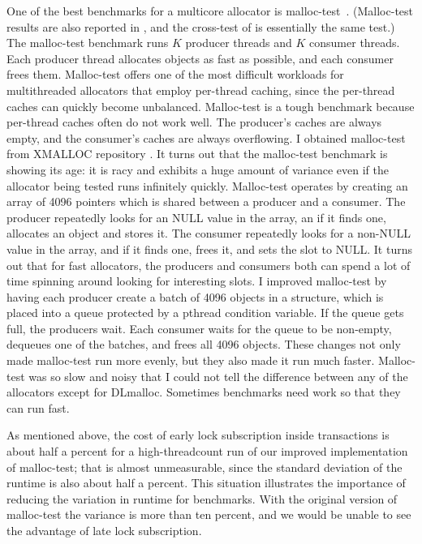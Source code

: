 \documentclass[natbib,sort&compress,10pt]{sigplanconf}
\begin{document}
One of the best benchmarks for a multicore allocator is
malloc-test~\cite{LeverBo00}.  (Malloc-test results are also reported
in \cite{Evans06}, and the cross-test of \cite{KukanovVo07} is
essentially the same test.)  The malloc-test benchmark runs $K$
producer threads and $K$ consumer threads.  Each producer thread
allocates objects as fast as possible, and each consumer frees them.
Malloc-test offers one of the most difficult workloads for
multithreaded allocators that employ per-thread caching, since the
per-thread caches can quickly become unbalanced.  Malloc-test is a
tough benchmark because per-thread caches often do not work well.  The
producer's caches are always empty, and the consumer's caches are
always overflowing.  I obtained malloc-test from XMALLOC repository
\cite{EderSc12}.  It turns out that the malloc-test benchmark is
showing its age: it is racy and exhibits a huge amount of variance
even if the allocator being tested runs infinitely quickly.
Malloc-test operates by creating an array of 4096 pointers which is
shared between a producer and a consumer.  The producer repeatedly
looks for an NULL value in the array, an if it finds one, allocates an
object and stores it.  The consumer repeatedly looks for a non-NULL
value in the array, and if it finds one, frees it, and sets the slot
to NULL\@.  It turns out that for fast allocators, the producers and
consumers both can spend a lot of time spinning around looking for
interesting slots.  I improved malloc-test by having each producer
create a batch of 4096 objects in a structure, which is placed into a
queue protected by a pthread condition variable.  If the queue gets
full, the producers wait.  Each consumer waits for the queue to be
non-empty, dequeues one of the batches, and frees all 4096 objects.
These changes not only made malloc-test run more evenly, but they also
made it run much faster.  Malloc-test was so slow and noisy that I
could not tell the difference between any of the allocators except for
DLmalloc.  Sometimes benchmarks need work so that they can run fast.

As mentioned above, the cost of early lock subscription inside
transactions is about half a percent for a high-threadcount run of our
improved implementation of malloc-test; that is almost unmeasurable,
since the standard deviation of the runtime is also about half a
percent.  This situation illustrates the importance of reducing the
variation in runtime for benchmarks.  With the original version of
malloc-test the variance is more than ten percent, and we would be
unable to see the advantage of late lock subscription.
\end{document}
